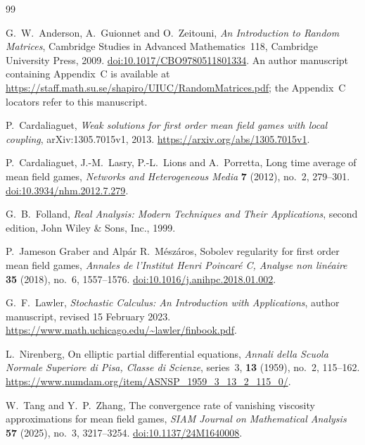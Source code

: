 \documentclass[11pt]{article}
\numberwithin{equation}{section}
\begin{document}
\begin{thebibliography}{99}

G.~W.~Anderson, A.~Guionnet and O.~Zeitouni,
\emph{An Introduction to Random Matrices},
Cambridge Studies in Advanced Mathematics~118,
Cambridge University Press, 2009.
\href{https://doi.org/10.1017/CBO9780511801334}{doi:10.1017/CBO9780511801334}.
An author manuscript containing Appendix~C is available at
\url{https://staff.math.su.se/shapiro/UIUC/RandomMatrices.pdf};
the Appendix~C locators refer to this manuscript.

P.~Cardaliaguet,
\emph{Weak solutions for first order mean field games with local coupling},
arXiv:1305.7015v1, 2013.
\url{https://arxiv.org/abs/1305.7015v1}.

P.~Cardaliaguet, J.-M.~Lasry, P.-L.~Lions and A.~Porretta,
Long time average of mean field games,
\emph{Networks and Heterogeneous Media} \textbf{7} (2012), no.~2, 279--301.
\href{https://doi.org/10.3934/nhm.2012.7.279}{doi:10.3934/nhm.2012.7.279}.

G.~B.~Folland,
\emph{Real Analysis: Modern Techniques and Their Applications},
second edition, John Wiley \& Sons, Inc., 1999.

P.~Jameson Graber and Alp\'ar R.~M\'esz\'aros,
Sobolev regularity for first order mean field games,
\emph{Annales de l'Institut Henri Poincar\'e C, Analyse non lin\'eaire}
\textbf{35} (2018), no.~6, 1557--1576.
\href{https://doi.org/10.1016/j.anihpc.2018.01.002}{doi:10.1016/j.anihpc.2018.01.002}.

G.~F.~Lawler,
\emph{Stochastic Calculus: An Introduction with Applications},
author manuscript, revised 15 February 2023.
\url{https://www.math.uchicago.edu/~lawler/finbook.pdf}.

L.~Nirenberg,
On elliptic partial differential equations,
\emph{Annali della Scuola Normale Superiore di Pisa, Classe di Scienze},
series~3, \textbf{13} (1959), no.~2, 115--162.
\url{https://www.numdam.org/item/ASNSP_1959_3_13_2_115_0/}.

W.~Tang and Y.~P.~Zhang,
The convergence rate of vanishing viscosity approximations for mean field games,
\emph{SIAM Journal on Mathematical Analysis} \textbf{57} (2025),
no.~3, 3217--3254.
\href{https://doi.org/10.1137/24M1640008}{doi:10.1137/24M1640008}.

\end{thebibliography}
\end{document}
